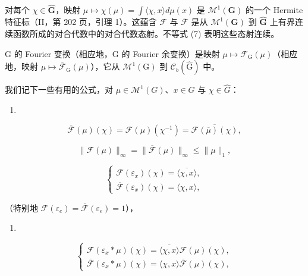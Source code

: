 对每个 \(\chi \in \widehat{\mathbf{G}}\)，映射 \(\mu \mapsto \chi(\mu) = \int \langle \chi, x \rangle d\mu(x)\) 是 \(\mathcal{M}^1(\mathbf{G})\) 的一个 Hermite 特征标（II，第 202 页，引理 1）。这蕴含 \(\mathcal{F}\) 与 \(\overline{\mathcal{F}}\) 是从 \(\mathcal{M}^1(\mathbf{G})\) 到 \(\widehat{\mathbf{G}}\) 上有界连续函数所成的对合代数中的对合代数态射。不等式 (7) 表明这些态射连续。

G 的 Fourier 变换（相应地，G 的 Fourier 余变换）是映射 \(\mu \mapsto \mathcal{F}_{\mathrm{G}}(\mu)\)（相应地，映射 \(\mu \mapsto \overline{\mathcal{F}}_{\mathrm{G}}(\mu)\)），它从 \(\mathcal{M}^1 (\mathrm{G})\) 到 \(\mathcal{C}_b(\widehat{\mathrm{G}})\) 中。

我们记下一些有用的公式，对 \(\mu\in\mathcal{M}^{1}(G)\)、\(x\in G\) 与 \(\chi\in\widehat{G}\)：

\begin{enumerate}
\def\labelenumi{(\arabic{enumi})}
\setcounter{enumi}{7}
\tightlist
\item
\end{enumerate}

\[
\overline {{\mathcal {F}}} (\mu) (\chi) = \mathcal {F} (\mu) (\chi^ {- 1}) = \overline {{\mathcal {F} (\overline {{\mu}}) (\chi)}},\tag{9}
\]

\[
\| \mathcal {F} (\mu) \| _ {\infty} = \| \overline {{\mathcal {F}}} (\mu) \| _ {\infty} \leqslant \| \mu \| _ {1},\tag{10}
\]

\[
\left\{ \begin{array}{l} \mathcal {F} (\varepsilon_ {x}) (\chi) = \overline {{\langle \chi , x \rangle}}, \\ \overline {{\mathcal {F}}} (\varepsilon_ {x}) (\chi) = \langle \chi , x \rangle , \end{array} \right.
\]

（特别地 \(\mathcal{F}(\varepsilon_e) = \overline{\mathcal{F}} (\varepsilon_e) = 1\)），

\begin{enumerate}
\def\labelenumi{(\arabic{enumi})}
\setcounter{enumi}{10}
\tightlist
\item
\end{enumerate}

\[
\left\{ \begin{array}{l} \mathcal {F} (\varepsilon_ {x} * \mu) (\chi) = \overline {{\langle \chi , x \rangle}} \mathcal {F} (\mu) (\chi), \\ \overline {{\mathcal {F}}} (\varepsilon_ {x} * \mu) (\chi) = \langle \chi , x \rangle \overline {{\mathcal {F}}} (\mu) (\chi), \end{array} \right.\tag{12}
\]

